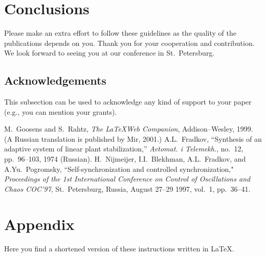 \documentclass{physcon}
\begin{document}
\section{Conclusions}
                                  
Please make an extra effort to follow these guidelines 
as the quality of the publications depends on you. 
Thank you for your cooperation and contribution. 
We look forward to seeing you at our conference in 
St.~Petersburg.

\subsection*{Acknowledgements}

This subsection can be used to acknowledge any kind 
of support to your paper (e.g., you can mention your grants).    

\begin{thebibliography}{55}
 M.~Goosens and S.~Rahtz,
    {\it The \LaTeX Web Companion},
    Addison--Wesley, 1999.
    (A Russian translation is published by Mir,  
    2001.)
 A.L.~Fradkov, ``Synthesis of an adaptive system
    of linear plant stabilization,'' {\it Avtomat. i Telemekh.},
    no.~12, pp.~96--103, 1974 (Russian).
 H.~Nijmeijer, I.I.~Blekhman, A.L.~Fradkov,
    and A.Yu.~Pogromsky, 
    ``Self-synchronization and controlled synchronization,"
    {\it Proceedings of the 1st International Conference on 
    Control of Oscillations and Chaos 
    COC'97}, St.~Petersburg, Russia, 
    August 27--29 1997, vol.~1, pp.~36--41.
\end{thebibliography}

\section*{Appendix}
Here you find a shortened version of these
instructions written in \LaTeX.
  
\end{document}
